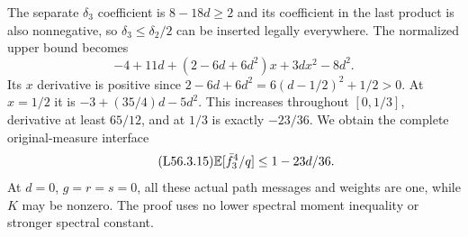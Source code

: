 The separate $\delta_3$ coefficient is $8-18d\ge2$ and its
coefficient in the last product is also nonnegative, so
$\delta_3\le\delta_2/2$ can be inserted legally everywhere.
The normalized upper bound becomes
\[
-4+11d+(2-6d+6d^2)x+3dx^2-8d^2.
\]
Its $x$ derivative is positive since
$2-6d+6d^2=6(d-1/2)^2+1/2>0$.
At $x=1/2$ it is $-3+(35/4)d-5d^2$.
This increases throughout $[0,1/3]$, derivative at least $65/12$,
and at $1/3$ is exactly $-23/36$.
We obtain the complete original-measure interface
\begin{equation}\tag{L56.3.15}\label{eq:L56:claim}
\mathbb E[\bar f_3^4/q]\le1-23d/36.
\end{equation}
At $d=0$, $g=r=s=0$, all these actual path messages and weights are
one, while $K$ may be nonzero. The proof uses no lower spectral
moment inequality or stronger spectral constant.

